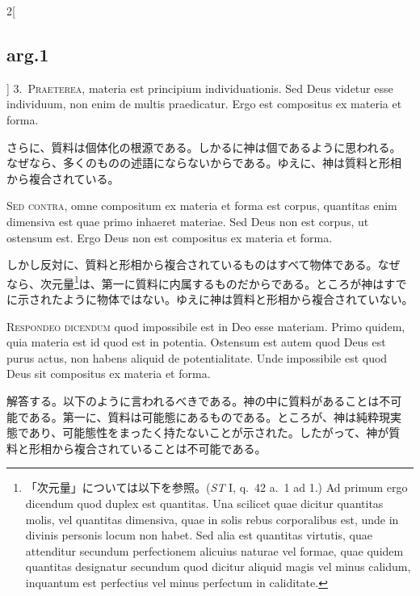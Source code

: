 \documentclass[paper=a4paper,fontsize=10pt,jafontsize=9pt,titlepage]{jlreq}
\begin{document}
\begin{paracol}{2}[\subsection{arg.1}]
3.~\textsc{Praeterea}, materia est principium individuationis. Sed Deus
 videtur esse individuum, non enim de multis praedicatur. Ergo est
 compositus ex materia et forma.

\switchcolumn

さらに、質料は個体化の根源である。しかるに神は個であるように思われる。
なぜなら、多くのものの述語にならないからである。ゆえに、神は質料と形相
から複合されている。

\switchcolumn*[\subsection{s.c.}]

\textsc{Sed contra}, omne compositum ex materia et forma est corpus,
quantitas enim dimensiva est quae primo inhaeret materiae. Sed Deus
non est corpus, ut ostensum est. Ergo Deus non est compositus ex
materia et forma.

\switchcolumn

しかし反対に、質料と形相から複合されているものはすべて物体である。なぜ
なら、次元量\footnote{「次元量」については以下を参照。(\textit{ST} I,
q.~42 a.~1 ad 1.) Ad primum ergo dicendum quod duplex est
quantitas. Una scilicet quae dicitur quantitas molis, vel quantitas
dimensiva, quae in solis rebus corporalibus est, unde in divinis
personis locum non habet. Sed alia est quantitas virtutis, quae
attenditur secundum perfectionem alicuius naturae vel formae, quae
quidem quantitas designatur secundum quod dicitur aliquid magis vel
minus calidum, inquantum est perfectius vel minus perfectum in
caliditate.}は、第一に質料に内属するものだからである。ところが神はすで
に示されたように物体ではない。ゆえに神は質料と形相から複合されていない。


\textsc{Respondeo dicendum} quod impossibile est in Deo esse materiam.
Primo quidem, quia materia est id quod est in potentia.  Ostensum est
autem quod Deus est purus actus, non habens aliquid de potentialitate.
Unde impossibile est quod Deus sit compositus ex materia et forma.

\switchcolumn

解答する。以下のように言われるべきである。神の中に質料があることは不可
能である。第一に、質料は可能態にあるものである。ところが、神は純粋現実
態であり、可能態性をまったく持たないことが示された。したがって、神が質
料と形相から複合されていることは不可能である。


\end{paracol}
\end{document}
